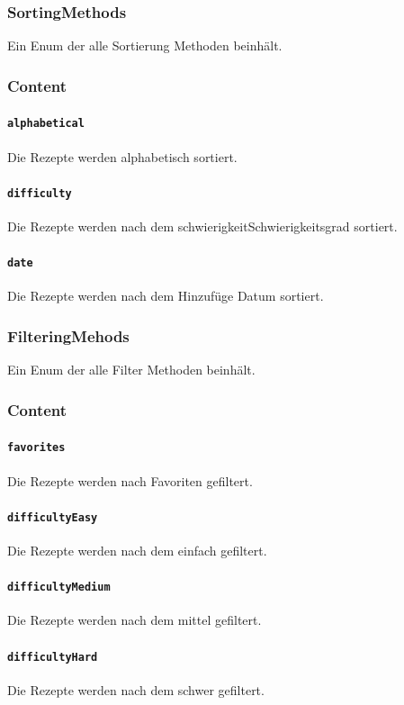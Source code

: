 \documentclass{entwurfsheft}
\begin{document}
    \subsubsection{SortingMethods}
        Ein Enum der alle Sortierung Methoden beinhält.
        \subsubsection*{Content}
            \paragraph*{\texttt{alphabetical}} Die Rezepte werden alphabetisch sortiert.
            \paragraph*{\texttt{difficulty}} Die Rezepte werden nach dem \gls{schwierigkeit}{Schwierigkeitsgrad} sortiert.
            \paragraph*{\texttt{date}} Die Rezepte werden nach dem Hinzufüge Datum sortiert.

    \subsubsection{FilteringMehods}
        Ein Enum der alle Filter Methoden beinhält.
        \subsubsection*{Content}
            \paragraph*{\texttt{favorites}} Die Rezepte werden nach Favoriten gefiltert.
            \paragraph*{\texttt{difficultyEasy}} Die Rezepte werden nach dem  einfach gefiltert.
            \paragraph*{\texttt{difficultyMedium}} Die Rezepte werden nach dem  mittel gefiltert.
            \paragraph*{\texttt{difficultyHard}} Die Rezepte werden nach dem  schwer gefiltert.
\end{document}
